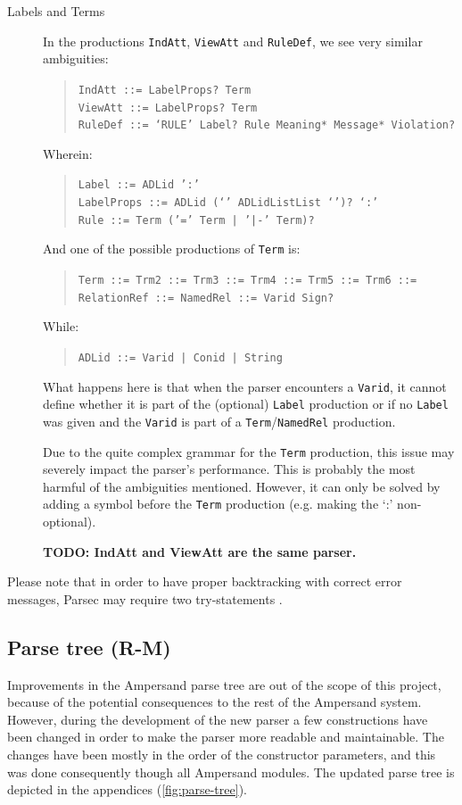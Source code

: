 \begin{description}
  \item[Labels and Terms]
    In the productions \texttt{IndAtt}, \texttt{ViewAtt} and \texttt{RuleDef}, we see very similar ambiguities:
    \begin{quote}
        \texttt{IndAtt ::= LabelProps? Term}\\
        \texttt{ViewAtt ::= LabelProps? Term}\\
        \texttt{RuleDef ::= `RULE' Label? Rule Meaning* Message* Violation?}
    \end{quote}
    Wherein:
    \begin{quote}
        \texttt{Label ::= ADLid ':'}\\
        \texttt{LabelProps ::= ADLid (`{' ADLidListList `}')? `:'}\\
        \texttt{Rule ::= Term ('=' Term | '|-' Term)?}
    \end{quote}
    And one of the possible productions of \texttt{Term} is:
    \begin{quote}
        \texttt{Term ::= Trm2 ::= Trm3 ::= Trm4 ::= Trm5 ::= Trm6 ::= RelationRef ::= NamedRel ::= Varid Sign?}
    \end{quote}
    While:
    \begin{quote}
        \texttt{ADLid ::= Varid | Conid | String}
    \end{quote}
    
    What happens here is that when the parser encounters a \texttt{Varid}, it cannot define whether it is part of the (optional) \texttt{Label} production or if no \texttt{Label} was given and the \texttt{Varid} is part of a \texttt{Term}/\texttt{NamedRel} production.
    
    Due to the quite complex grammar for the \texttt{Term} production, this issue may severely impact the parser's performance.
    This is probably the most harmful of the ambiguities mentioned.
    However, it can only be solved by adding a symbol before the \texttt{Term} production (e.g. making the `:' non-optional).
    
    \textbf{TODO: IndAtt and ViewAtt are the same parser.}
\end{description}
%
Please note that in order to have proper backtracking with correct error messages, Parsec may require two try-statements .

\subsection{Parse tree (R-M)}
\label{subsec:design-parse-tree}
Improvements in the Ampersand parse tree are out of the scope of this project, because of the potential consequences to the rest of the Ampersand system.
However, during the development of the new parser a few constructions have been changed in order to make the parser more readable and maintainable.
The changes have been mostly in the order of the constructor parameters, and this was done consequently though all Ampersand modules.
The updated parse tree is depicted in the appendices (\autoref{fig:parse-tree}).

